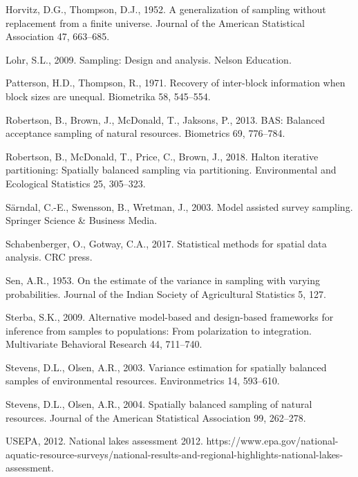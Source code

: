 \documentclass[]{elsarticle} %
\begin{document}
\leavevmode\hypertarget{ref-horvitz1952generalization}{}%
Horvitz, D.G., Thompson, D.J., 1952. A generalization of sampling
without replacement from a finite universe. Journal of the American
Statistical Association 47, 663--685.

\leavevmode\hypertarget{ref-lohr2009sampling}{}%
Lohr, S.L., 2009. Sampling: Design and analysis. Nelson Education.

\leavevmode\hypertarget{ref-patterson1971recovery}{}%
Patterson, H.D., Thompson, R., 1971. Recovery of inter-block information
when block sizes are unequal. Biometrika 58, 545--554.

\leavevmode\hypertarget{ref-robertson2013bas}{}%
Robertson, B., Brown, J., McDonald, T., Jaksons, P., 2013. BAS: Balanced
acceptance sampling of natural resources. Biometrics 69, 776--784.

\leavevmode\hypertarget{ref-robertson2018halton}{}%
Robertson, B., McDonald, T., Price, C., Brown, J., 2018. Halton
iterative partitioning: Spatially balanced sampling via partitioning.
Environmental and Ecological Statistics 25, 305--323.

\leavevmode\hypertarget{ref-sarndal2003model}{}%
Särndal, C.-E., Swensson, B., Wretman, J., 2003. Model assisted survey
sampling. Springer Science \& Business Media.

\leavevmode\hypertarget{ref-schabenberger2017statistical}{}%
Schabenberger, O., Gotway, C.A., 2017. Statistical methods for spatial
data analysis. CRC press.

\leavevmode\hypertarget{ref-sen1953estimate}{}%
Sen, A.R., 1953. On the estimate of the variance in sampling with
varying probabilities. Journal of the Indian Society of Agricultural
Statistics 5, 127.

\leavevmode\hypertarget{ref-sterba2009alternative}{}%
Sterba, S.K., 2009. Alternative model-based and design-based frameworks
for inference from samples to populations: From polarization to
integration. Multivariate Behavioral Research 44, 711--740.

\leavevmode\hypertarget{ref-stevens2003variance}{}%
Stevens, D.L., Olsen, A.R., 2003. Variance estimation for spatially
balanced samples of environmental resources. Environmetrics 14,
593--610.

\leavevmode\hypertarget{ref-stevens2004spatially}{}%
Stevens, D.L., Olsen, A.R., 2004. Spatially balanced sampling of natural
resources. Journal of the American Statistical Association 99, 262--278.

\leavevmode\hypertarget{ref-USEPA2012NLA}{}%
USEPA, 2012. National lakes assessment 2012.
https://www.epa.gov/national-aquatic-resource-surveys/national-results-and-regional-highlights-national-lakes-assessment.
\end{document}
